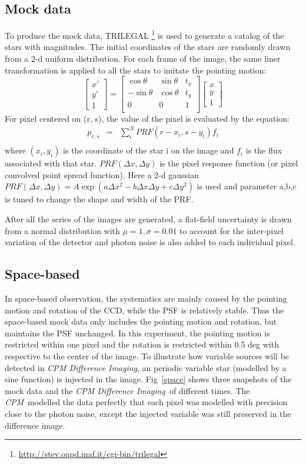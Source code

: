 \documentclass[12pt, preprint]{aastex}
\newcommand{\project}[1]{\textsl{#1}}
\newcommand{\cpm}{\project{CPM}}
\newcommand{\cpmdiff}{\project{CPM Difference Imaging}}
\begin{document}
\subsection{Mock data}
To produce the mock data, TRILEGAL \footnote{\url{http://stev.oapd.inaf.it/cgi-bin/trilegal}} is used to generate a catalog of the stars with magnitudes. 
The initial coordinates of the stars are randomly drawn from a 2-d uniform distribution. 
For each frame of the image, the same liner transformation is applied  to all the stars to imitate the pointing motion:
\[
\begin{bmatrix}
    x' \\
    y' \\
    1
\end{bmatrix}
=
\begin{bmatrix}
    \cos \theta & \sin \theta & t_x \\
    -\sin \theta & \cos \theta & t_y \\
    0 & 0 & 1 \\
\end{bmatrix}
\begin{bmatrix}
    x \\
    y \\
    1
\end{bmatrix}
\] 
For pixel centered on (r, s), the value of the pixel is evaluated by the equation:
\begin{eqnarray}
p_{r,s} &=& \sum_{i}^{N} PRF(r-x_i, s-y_i) f_i\\
\end{eqnarray}
where $(x_i,y_i)$ is the coordinate of the star i on the image and $f_i$ is the flux associated with that star. 
$PRF(\Delta x, \Delta y)$ is the pixel response function (or pixel convolved point spread function). 
Here a 2-d gaussian $PRF(\Delta x, \Delta y) = A \exp(a\Delta x^2-b\Delta x \Delta y+c\Delta y^2)$ is used and parameter a,b,c is tuned to change the shape and width of the PRF.

After all the series of the images are generated, a flat-field uncertainty is drawn from a normal distribution with $\mu=1, \sigma=0.01$ to account for the inter-pixel variation of the detector and photon noise is also added to each individual pixel.

\subsection{Space-based}
In space-based observation, the systematics are mainly caused by the pointing motion and rotation of the CCD, while the PSF is relatively stable. 
Thus the space-based mock data only includes the pointing motion and rotation, but maintains the PSF unchanged.
In this experiment, the pointing motion is restricted within one pixel and the rotation is restricted within 0.5 deg with respective to the center of the image.  
To illustrate how variable sources will be detected in \cpmdiff, an periodic variable star (modelled by a sine function) is injected in the image.
Fig~\ref{space} shows three snapshots of the mock data and the \cpmdiff\ of different times. 
The \cpm\ modelled the data perfectly that each pixel was modelled with precision close to the photon noise, except  the injected variable was still preserved in the difference image.
\end{document}
